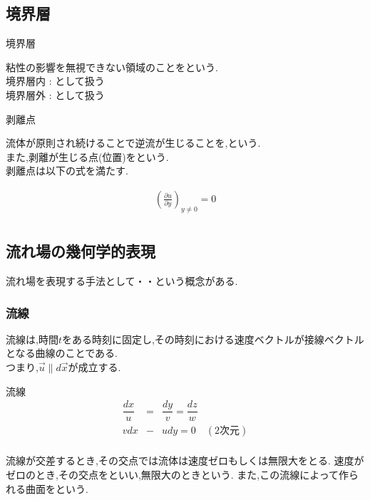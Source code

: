 \documentclass[a4paper]{jsarticle}
\begin{document}
\subsection{境界層}
\begin{itembox}[l]{境界層}
    \begin{center}
        粘性の影響を無視できない領域のことをという.\\
        境界層内 : として扱う  \\
        境界層外 : として扱う
    \end{center}
\end{itembox}
\begin{itembox}[l]{剥離点}
    \begin{center}
        流体が原則され続けることで逆流が生じることを,という.\\
        また,剥離が生じる点(位置)をという.\\
        剥離点は以下の式を満たす.
    \end{center}
    \begin{eqnarray*}
        \left(\frac{\partial u}{\partial y}\right)_{y\neq 0}=0\\
    \end{eqnarray*}
\end{itembox}
\subsection{流れ場の幾何学的表現}
流れ場を表現する手法として・・という概念がある.\\
\subsubsection{流線}
流線は,時間$t$をある時刻に固定し,その時刻における速度ベクトルが接線ベクトルとなる曲線のことである.\\
つまり,$\vec{u}\parallel d\vec{x}$が成立する.
\begin{itembox}[l]{流線}
    \begin{eqnarray*}
        \dfrac{dx}{u}&=&\dfrac{dy}{v}=\dfrac{dz}{w}\\
        vdx&-&udy=0\quad (2次元)\\
    \end{eqnarray*}
\end{itembox}
流線が交差するとき,その交点では流体は速度ゼロもしくは無限大をとる.
速度がゼロのとき,その交点をといい,無限大のときという.
また,この流線によって作られる曲面をという.
\end{document}
